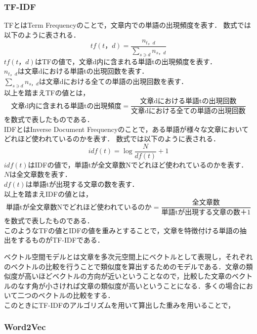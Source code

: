 \subsubsection{TF-IDF}
\label{tech:tfidf}
TFとはTerm Frequencyのことで，文章内での単語の出現頻度を表す．
数式では以下のように表される．
\vspace{3mm}
\[
tf(t，d) = \frac{n_{t，d}}{\sum_{s \ni{d}}n_{s，d}}
\]
\vspace{3mm}
$ tf(t，d) $はTFの値で，文章d内に含まれる単語tの出現頻度を表す．\\
$ n_{t，d} $は文章dにおける単語tの出現回数を表す．\\
$ \sum_{s \ni{d}}n_{s，d} $は文章dにおける全ての単語の出現回数を表す．\\
以上を踏まえTFの値とは，
\vspace{3mm}
\[
\mbox{文章d内に含まれる単語tの出現頻度} = \frac{\mbox{文章dにおける単語tの出現回数}}{\mbox{文章dにおける全ての単語の出現回数}}
\]
\vspace{3mm}
を数式で表したものである．\\
IDFとはInverse Document Frequencyのことで，ある単語が様々な文章においてどれほど使われているのかを表す．
数式では以下のように表される．
\vspace{3mm}
\[
idf(t) = \log{\frac{N}{df(t)}+1}
\]
\vspace{3mm}
$ idf(t) $はIDFの値で，単語tが全文章数Nでどれほど使われているのかを表す．\\
$ N $は全文章数を表す．\\
$ df(t) $は単語tが出現する文章の数を表す．\\
以上を踏まえIDFの値とは，
\vspace{3mm}
\[
\mbox{単語tが全文章数Nでどれほど使われているのか} = \frac{\mbox{全文章数}}{\mbox{単語tが出現する文章の数}＋1}
\]
\vspace{3mm}
を数式で表したものである．\\
このようなTFの値とIDFの値を重みとすることで，文章を特徴付ける単語の抽出をするものがTF-IDFである．

\label{tech:voctorkukan}
ベクトル空間モデルとは文章を多次元空間上にベクトルとして表現し，それぞれのベクトルの比較を行うことで類似度を算出するためのモデルである．文章の類似度が高いほどベクトルの方向が近いということなので，比較した文章のベクトルのなす角が小さければ文章の類似度が高いということになる．多くの場合において二つのベクトルの比較をする．\\
このときにTF-IDFのアルゴリズムを用いて算出した重みを用いることで，


\subsubsection{Word2Vec}
\label{tech:Word2vec}



